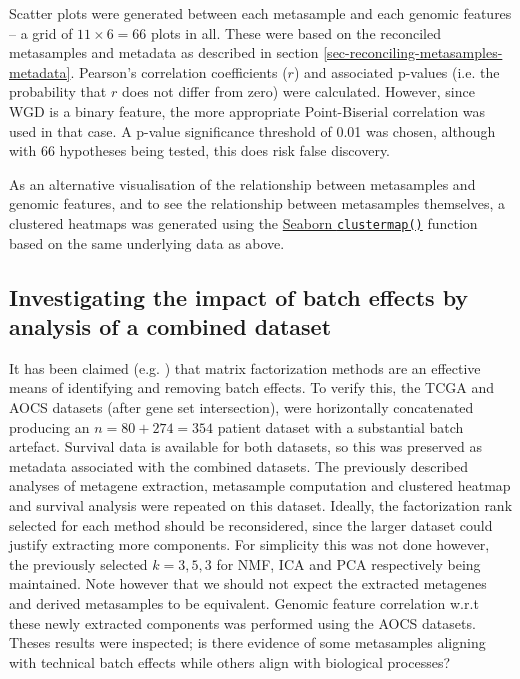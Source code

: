 \documentclass[draft,tikz, 12pt,a4paper,oneside,fleqn]{article}
\begin{document}
Scatter plots were generated between each metasample and each genomic features -- a grid of $11 \times 6 = 66$ plots in all.  These were based on the reconciled metasamples and metadata as described in section \ref{sec-reconciling-metasamples-metadata}.  Pearson's correlation coefficients ($r$) and associated p-values (i.e. the probability that $r$ does not differ from zero) were calculated.   However, since WGD is a binary feature, the more appropriate Point-Biserial correlation was used in that case.  A p-value significance threshold of 0.01 was chosen, although with 66 hypotheses being tested, this does risk false discovery.

As an alternative visualisation of the relationship between metasamples and genomic features, and to see the relationship between metasamples themselves, a clustered heatmaps was generated using the \href{https://seaborn.pydata.org/generated/seaborn.clustermap.html}{Seaborn {\tt clustermap()}} function based on the same underlying data as above.  

\subsection{Investigating the impact of batch effects by analysis of a combined dataset}

It has been claimed (e.g. \cite{Stein-OBrien2018}) that matrix factorization methods are an effective means of identifying and removing batch effects.  To verify this, the TCGA and AOCS datasets (after gene set intersection), were horizontally concatenated producing an $n=80+274=354$ patient dataset with a substantial batch artefact.  Survival data is available for both datasets, so this was preserved as metadata associated with the combined datasets. The previously described analyses of metagene extraction, metasample computation and clustered heatmap and survival analysis were repeated on this dataset.  Ideally, the factorization rank selected for each method should be reconsidered, since the larger dataset could justify extracting more components.  For simplicity this was not done however, the previously selected $k = 3,5,3$ for NMF, ICA and PCA respectively being maintained.   Note however that we should not expect the extracted metagenes and derived metasamples to be equivalent. Genomic feature correlation w.r.t these newly extracted components was performed using the AOCS datasets.  Theses results were inspected; is there evidence of some metasamples aligning with technical batch effects while others align with biological processes?
\end{document}
